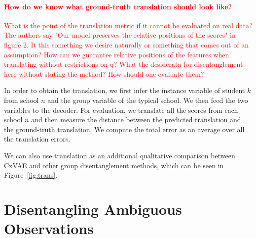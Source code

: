 \documentclass{article} %
\newcommand{\todo}[1]{\textcolor{red}{#1}}
\begin{document}
\todo{\paragraph{How do we know what ground-truth translation should look like?} What is the point of the translation metric if it cannot be evaluated on real data? The authors say "Our model preserves the relative positions of the scores" in figure 2. It this something we desire naturally or something that comes out of an assumption? How can we guarantee relative positions of the features when translating without restrictions on q? What the desiderata for disentanglement here without stating the method? How should one evaluate them?}

In order to obtain the translation, we first infer the instance variable of student $k$ from school $n$ and the group variable of the typical school. We then feed the two variables to the decoder. For evaluation, we translate all the scores from each school $n$ and then measure the distance between the predicted translation and the ground-truth translation. We compute the total error as an average over all the translation errors.

We can also use translation as an additional qualitative comparison between CxVAE and other group disentanglement methods, which can be seen in Figure~\ref{fig:trans}.

\section{Disentangling Ambiguous Observations}
\end{document}
